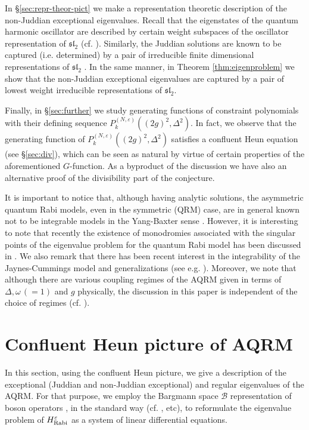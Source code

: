 \documentclass[11pt]{article}
\numberwithin{equation}{section}
\newcommand{\e}{\varepsilon}
\newcommand{\HRabi}[1]{H_{\text{\upshape Rabi}}^{#1}} %
\newcommand{\Bargmann}{\mathcal{B}}
\theoremstyle{plain}
\theoremstyle{definition}
\theoremstyle{remark}
\begin{document}
In \S\ref{sec:repr-theor-pict}  we make a representation theoretic description of the non-Juddian exceptional eigenvalues. Recall that the eigenstates of the quantum harmonic oscillator are described by certain weight subspaces of the oscillator representation of \(\mathfrak{sl}_2\) (cf. \cite{HT1992}). Similarly, the Juddian solutions are known to be captured (i.e. determined) by a pair of irreducible finite dimensional representations of \(\mathfrak{sl}_2\) \cite{W2016JPA}. In the same manner, in Theorem \ref{thm:eigenproblem} we show that the non-Juddian exceptional eigenvalues are captured by a pair of lowest weight irreducible representations of \(\mathfrak{sl}_2\). 

Finally, in \S \ref{sec:further} we study generating functions of constraint polynomials with their defining sequence
$P_k^{(N,\e)}((2g)^2,\Delta^2)$. In fact, we observe that the generating function of $P_k^{(N,\e)}((2g)^2,\Delta^2)$ satisfies a
confluent Heun equation (see \S\ref{sec:div}), which can be seen as natural by virtue of certain properties of
the aforementioned $G$-function. As a byproduct of the discussion we have also an alternative proof of the divisibility part of the conjecture.

It is important to notice that, although having analytic solutions, the asymmetric quantum Rabi models,
even in the symmetric (QRM) case, are in general known not to be integrable models in the Yang-Baxter sense \cite{BZ2015}. However, it is interesting to note that recently the existence of monodromies associated with the singular
points of the eigenvalue problem for the quantum Rabi model has been discussed in \cite{CCR2016}. We also remark that there has been recent interest in the integrability of the  Jaynes-Cummings model and generalizations (see e.g. \cite{LPN2016}). Moreover, we note that although there are various coupling regimes of the AQRM given in terms of $\Delta, \omega\, (=1)$ and $g$ physically, the discussion in this paper is independent of the choice of regimes (cf. \cite{BMSSRWU2017}).

\section{Confluent Heun picture of AQRM} \label{sec:confpict}

In this section, using the confluent Heun picture, we give a description of the exceptional (Juddian and non-Juddian exceptional) and regular eigenvalues of the AQRM. For that purpose, we employ the Bargmann space \(\Bargmann\) representation of boson operators \cite{Bar1961}, in the standard way (cf. \cite{K1985JMP,B2011PRL-OnlineSupplement}, etc), to reformulate the eigenvalue problem of \(\HRabi{\e}\) as a system of linear differential equations.
\end{document}

